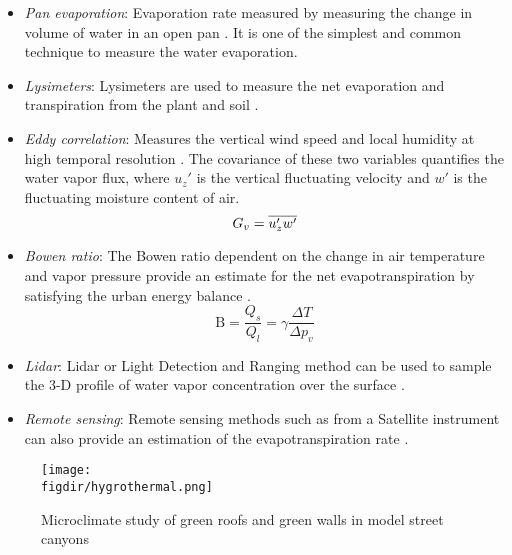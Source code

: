 \begin{itemize}
	\item \textit{Pan evaporation}: Evaporation rate measured by measuring the change in volume of water in an open pan \citep{Finnigan1979, crowell2000guidelines, Farquhar2007, abtew2012evaporation}. It is one of the simplest and common technique to measure the water evaporation. 
	\item \textit{Lysimeters}: Lysimeters are used to measure the net evaporation and transpiration from the plant and soil \citep{Abtew1996,abtew2012evaporation}. 
	\item \textit{Eddy correlation}: Measures the vertical wind speed and local humidity at high temporal resolution \citep{German2000, shuttleworth1993evaporation}. The covariance of these two variables quantifies the water vapor flux, where $u_z'$ is the vertical fluctuating velocity and $w'$ is the fluctuating moisture content of air.
		\begin{equation}
		G_v = \overline{u_z'w'}
		\end{equation}
	\item \textit{Bowen ratio}: The Bowen ratio dependent on the change in air temperature and vapor pressure provide an estimate for the net evapotranspiration by satisfying the urban energy balance \citep{Chen2006,Thom1975,DosReis1998,abtew2012evaporation,Deardorff1978}.
		\begin{equation}
		\mathrm{B} = \frac{Q_s}{Q_l} = \gamma \frac{\Delta T}{\Delta p_v}  
		\end{equation}
	\item \textit{Lidar}: Lidar or Light Detection and Ranging method can be used to sample the 3-D profile of water vapor concentration over the surface \citep{abtew2012evaporation,Idso1977}. 
	\item \textit{Remote sensing}: Remote sensing methods such as from a Satellite instrument can also provide an estimation of the evapotranspiration rate \citep{Kustas1990,Melesse2008,Melesse2009,abtew2012evaporation}. 
\end{itemize}


\begin{figure}[t]
	\centering
	\texttt{[image: \\figdir/hygrothermal.png]}
	\caption{Microclimate study of green roofs and green walls in model street canyons \citep{Djedjig2015}}
	\label{fig:hygrothermal}
\end{figure}

